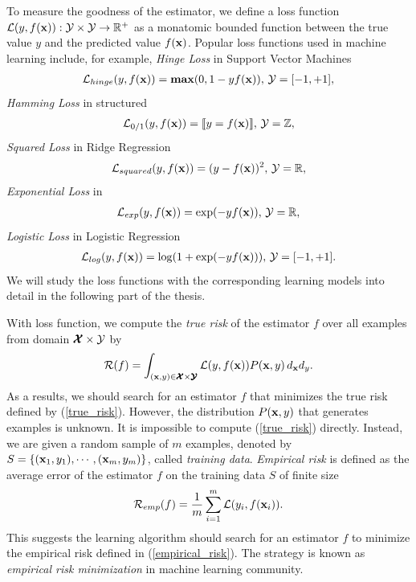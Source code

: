 To measure the goodness of the estimator, we define a loss function $\mathcal{L}(y,f(\mathbf {x})):\mathcal{Y}\times\mathcal{Y}\rightarrow\mathbb{R}^+$ as a monatomic bounded function between the true value $y$ and the predicted value $f(\mathbf {x})$.
Popular loss functions used in machine learning include, for example,
\textit{Hinge Loss} in Support Vector Machines \citep{Cortes95support}
\begin{align}
	\mathcal{L}_{hinge}(y,f(\mathbf {x})) = \textbf{max} (0,1-y f(\mathbf {x})),\, \mathcal{Y}=[-1,+1], \label{hinge_loss}
\end{align}
\textit{Hamming Loss} in structured \svm\ \citep{THJA04}
\begin{align*}
	\mathcal{L}_{0/1}(y,f(\mathbf {x})) = {\llbracket y=f(\mathbf {x}) \rrbracket},\, \mathcal{Y} = \mathbb{Z},
\end{align*}
\textit{Squared Loss} in Ridge Regression \citep{Hoerl00ridge}
\begin{align*}
	\mathcal{L}_{squared}(y,f(\mathbf {x})) = (y-f(\mathbf {x}))^2,\, \mathcal{Y}=\mathbb{R},
\end{align*}
\textit{Exponential Loss} in \adaboost\ \citep{Schapire99improved}
\begin{align*}
	\mathcal{L}_{exp}(y,f(\mathbf {x})) = \exp(-y f(\mathbf {x})),\, \mathcal{Y}=\mathbb{R},
\end{align*}
\textit{Logistic Loss} in Logistic Regression \citep{Chen99}
\begin{align}
	\mathcal{L}_{log}(y,f(\mathbf {x})) = \log(1+\exp(-y f(\mathbf {x}))),\, \mathcal{Y}=[-1,+1]. \label{log_loss}
\end{align}
We will study the loss functions with the corresponding learning models into detail in the following part of the thesis.

With loss function, we compute the \textit{true risk} of the estimator $f$ over all examples from domain $\pmb {\mathcal{X}}\times\mathcal{Y}$ by
\begin{align}
	\mathcal{R}(f) = \int_{(\mathbf {x},y)\in\pmb {\mathcal{X}}\times\pmb {\mathcal{Y}}}\mathcal{L}(y,f(\mathbf {x}))P(\mathbf {x},y)\,d_{\mathbf {x}}d_{y} \label{true_risk}.
\end{align}
As a results, we should search for an estimator $f$ that minimizes the true risk defined by (\ref{true_risk}).
However, the distribution $P(\mathbf {x},y)$ that generates examples is unknown.
It is impossible to compute (\ref{true_risk}) directly.
Instead, we are given a random sample of $m$ examples, denoted by $S=\{(\mathbf {x}_1,y_1),\cdots,(\mathbf {x}_m,y_m)\}$, called \textit{training data}.
\textit{Empirical risk} is defined as the average error of the estimator $f$ on the training data $S$ of finite size
\begin{align}
	\mathcal{R}_{emp}(f) = \frac{1}{m}\sum_{i=1}^{m}\mathcal{L}(y_i,f(\mathbf {x}_i)) \label{empirical_risk}.
\end{align}
This suggests the learning algorithm should search for an estimator $f$ to minimize the empirical risk defined in (\ref{empirical_risk}).
The strategy is known as \textit{empirical risk minimization} \citep{Vapnik92principles} in machine learning community.

